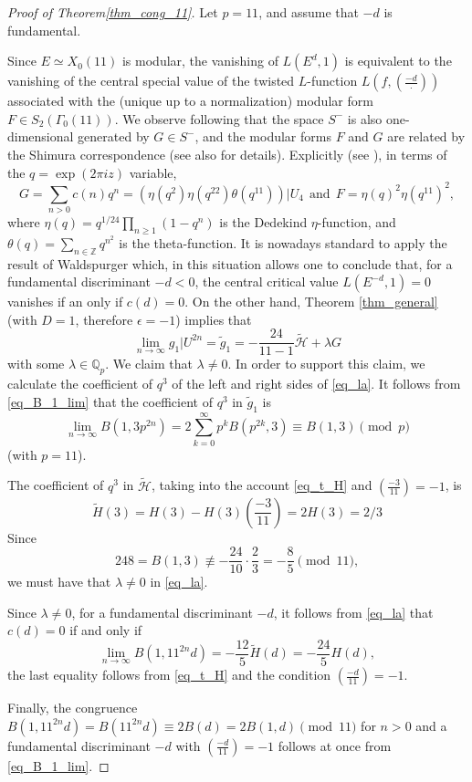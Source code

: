 \documentclass[11pt,letterpaper]{amsart}
\newcommand{\Z}{{\mathbb Z}}
\newcommand{\Q}{{\mathbb Q}}
\newcommand{\cH}{{\mathcal H}}
\theoremstyle{remark}
\begin{document}
\begin{proof}[Proof of Theorem\ref{thm_cong_11}]
Let $p=11$, and assume that $-d$ is fundamental. 

Since $E \simeq X_0(11)$ is modular, the vanishing of $L(E^d,1)$ is equivalent to the vanishing of the central special value of the twisted $L$-function 
$L\left(f, \left( \frac{-d}{\cdot} \right) \right)$ associated with the (unique up to a normalization) modular form $F \in S_2(\Gamma_0(11))$. 
We observe following \cite{Ant_Kohnen} that the space $S^-$ is also one-dimensional generated by $G \in S^-$, and the modular forms $F$ and $G$ are related by the Shimura correspondence (see also \cite{Kohnen} for details). 
Explicitly (see \cite{Ant_Kohnen}), in terms of the $q = \exp(2 \pi i z)$ variable, 
\[
G= \sum_{n>0}c(n) q^n = \left( \eta(q^2) \eta(q^{22}) \theta(q^{11}) \right) |U_4 ~~ \text{and} ~~ F= \eta(q)^2 \eta(q^{11})^2,
\]
where $\eta(q) = q^{1/24} \prod_{n \geq 1} (1-q^n)$ is the Dedekind $\eta$-function, and $\theta(q) = \sum_{n \in \Z} q^{n^2}$ is the theta-function.
It is nowadays standard to apply the result of Waldspurger \cite{Waldspurger} which, in this situation allows one to conclude that, for a fundamental discriminant $-d<0$,
the central critical value  $L(E^{-d},1)=0$ vanishes if an only if $c(d)=0$.
On the other hand, Theorem  \ref{thm_general} (with $D=1$, therefore $\epsilon=-1$) implies that 
\begin{equation} \label{eq_la}
\lim_{n \rightarrow \infty} g_1|U^{2n} = \tilde{g}_1 = -\frac{24}{11-1} \tilde{\cH} + \lambda G
\end{equation}
with some $\lambda \in \Q_p$.
We claim that $\lambda \neq 0$. In order to support this claim, we calculate the coefficient of $q^3$ of the left and right sides of \eqref{eq_la}.
It follows from \eqref{eq_B_1_lim} that the coefficient of $q^3$ in $\tilde{g}_1$ is 
\[
\lim_{n \rightarrow \infty} B(1,3p^{2n}) = 2 \sum_{k=0}^\infty p^k B(p^{2k},3) \equiv B(1,3) \pmod p
\] 
(with $p=11$).

The coefficient of $q^3$ in $\tilde{\cH}$, taking into the account \eqref{eq_t_H} and $\left( \frac{-3}{11} \right) = -1$, is
\[
\tilde{H}(3) = H(3) - H(3) \left( \frac{-3}{11} \right) = 2H(3) = 2/3
\]
Since 
\[
248 = B(1,3) \not\equiv  -\frac{24}{10} \cdot \frac{2}{3} = -\frac{8}{5} \pmod {11},
\]
we must have that $\lambda \neq 0$ in \eqref{eq_la}.

Since $\lambda \neq 0$, for a fundamental discriminant $-d$, it follows from \eqref{eq_la} that $c(d)=0$ if and only if 
\[
\lim_{n \rightarrow \infty} B(1,11^{2n}d) = -\frac{12}{5} \tilde{H}(d) = -\frac{24}{5} H(d),
\]
the last equality follows from \eqref{eq_t_H} and the condition $\left( \frac{-d}{11} \right) = -1$.

Finally, the congruence $B(1, 11^{2n}d) = B(11^{2n}d) \equiv 2B(d) = 2 B(1,d) \pmod {11}$ for $n>0$ and a fundamental discriminant $-d$ with  $\left( \frac{-d}{11} \right) = -1$ follows at once from \eqref{eq_B_1_lim}.

\end{proof}
\end{document}
